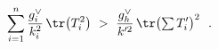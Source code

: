 \begin{equation}\label{reducedproblem}
\sum_{i=1}^{n} \frac{g^{\vee}_{i}}{k_{i}^{2}}\, \tr  \bigl(T_{i}^{2}\bigr)\ >\
\frac{g_{h}^{\vee }}{k'^{2}}\, \tr \bigl({\textstyle \sum}\,  T_{i}'\bigr)^{2}\ \ .
\end{equation}

